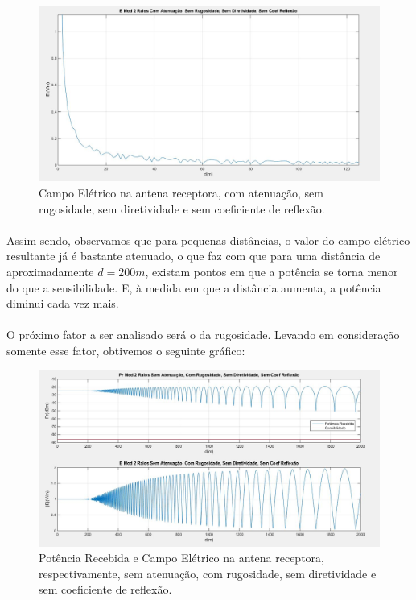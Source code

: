 \FloatBarrier
\begin{figure}[!htp]
\centering
\includegraphics[scale = 0.3]{Figuras/CA_SR_SD_SCR_E.JPG}
\caption{Campo Elétrico na antena receptora, com atenuação, sem rugosidade, sem diretividade e sem coeficiente de reflexão.}
\end{figure}
\FloatBarrier

\paragraph{}Assim sendo, observamos que para pequenas distâncias, o valor do campo elétrico resultante já é bastante atenuado, o que faz com que para uma distância de aproximadamente $d = 200m$, existam pontos em que a potência se torna menor do que a sensibilidade. E, à medida em que a distância aumenta, a potência diminui cada vez mais.

\paragraph{}O próximo fator a ser analisado será o da rugosidade. Levando em consideração somente esse fator, obtivemos o seguinte gráfico:

\FloatBarrier
\begin{figure}[!htp]
\centering
\includegraphics[scale = 0.3]{Figuras/SA_CR_SD_SCR.JPG}
\caption{Potência Recebida e Campo Elétrico na antena receptora, respectivamente, sem atenuação, com rugosidade, sem diretividade e sem coeficiente de reflexão.}
\end{figure}
\FloatBarrier

